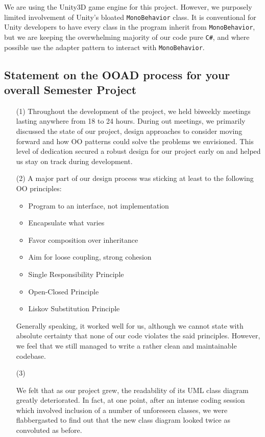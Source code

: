 \documentclass[11pt]{amsart}
\begin{document}
We are using the Unity3D game engine for this project. However, we purposely limited involvement of Unity's bloated \texttt{MonoBehavior} class. It is conventional for Unity developers to have every class in the program inherit from \texttt{MonoBehavior}, but we are keeping the overwhelming majority of our code pure \texttt{C\#}, and where possible use the adapter pattern to interact with \texttt{MonoBehavior}. 

\subsection*{Statement on the OOAD process for your overall Semester Project} \phantom{}

\begin{enumerate}
    \item[(1)] Throughout the development of the project, we held biweekly meetings lasting anywhere from 18 to 24 hours. During out meetings, we primarily discussed the state of our project, design approaches to consider moving forward and how OO patterns could solve the problems we envisioned. This level of dedication secured a robust design for our project early on and helped us stay on track during development. 
    \item[(2)] A major part of our design process was sticking at least to the following OO principles:
    \begin{itemize}
        \item Program to an interface, not implementation
        \item Encapsulate what varies
        \item Favor composition over inheritance
        \item Aim for loose coupling, strong cohesion
        \item Single Responsibility Principle
        \item Open-Closed Principle
        \item Liskov Substitution Principle
    \end{itemize}

    Generally speaking, it worked well for us, although we cannot state with absolute certainty that none of our code violates the said principles. However, we feel that we still managed to write a rather clean and maintainable codebase. 
    
    \item[(3)]
    
    We felt that as our project grew, the readability of its UML class diagram greatly deteriorated. In fact, at one point, after an intense coding session which involved inclusion of a number of unforeseen classes, we were flabbergasted to find out that the new class diagram looked twice as convoluted as before.


\end{enumerate}
\end{document}
